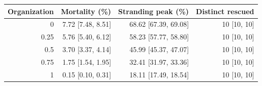 \begin{tabular}{rrrr}
\toprule
Organization & Mortality (\%) & Stranding peak (\%) & Distinct rescued \\
\midrule
0 & 7.72 [7.48, 8.51] & 68.62 [67.39, 69.08] & 10 [10, 10] \\
0.25 & 5.76 [5.40, 6.12] & 58.23 [57.77, 58.80] & 10 [10, 10] \\
0.5 & 3.70 [3.37, 4.14] & 45.99 [45.37, 47.07] & 10 [10, 10] \\
0.75 & 1.75 [1.54, 1.95] & 32.41 [31.97, 33.36] & 10 [10, 10] \\
1 & 0.15 [0.10, 0.31] & 18.11 [17.49, 18.54] & 10 [10, 10] \\
\bottomrule
\end{tabular}
